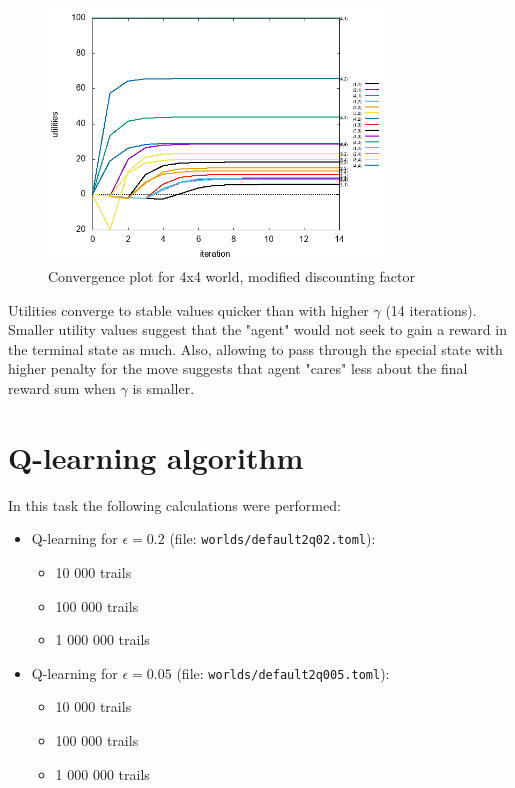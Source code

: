 \documentclass[12pt,a4paper]{article} %
\begin{document}
\begin{figure}[H]
\centering
	\includegraphics[width=0.8\textwidth]{../results/default5.png}
	\caption{Convergence plot for 4x4 world, modified discounting factor}
	\label{q5}
\end{figure}

Utilities converge to stable values quicker than with higher $\gamma$ (14 iterations). Smaller utility values suggest that the "agent" would not seek to gain a reward in the terminal state as much. Also, allowing to pass through the special state with higher penalty for the move suggests that agent "cares" less about the final reward sum when $\gamma$ is smaller.

\section{Q-learning algorithm}\label{sec_qlearn}

In this task the following calculations were performed:
\begin{itemize}
	\item Q-learning for $\epsilon = 0.2$ (file: \texttt{worlds/default2q02.toml}): 
	\begin{itemize}
		\item 10 000 trails
		\item 100 000 trails
		\item 1 000 000 trails
	\end{itemize}
	\item Q-learning for $\epsilon = 0.05$ (file: \texttt{worlds/default2q005.toml}):
	\begin{itemize}
		\item 10 000 trails
		\item 100 000 trails
		\item 1 000 000 trails
	\end{itemize}
\end{itemize}
\end{document}
